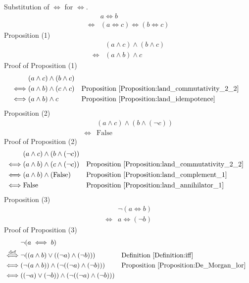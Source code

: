 \begin{prop}
\label{Proposition:iff_substitution_iff}
Substitution of $\iff$ for $\iff$.
\begin{align*}
& a \iff b \\
\iff & (a \iff c) \iff (b \iff c)
\end{align*}
Proposition (1)
\begin{align*}
& (a \land c) \land (b \land c) \\
\iff & (a \land b) \land c
\end{align*}
Proof of Proposition (1)
\begin{align*}
& (a \land c) \land (b \land c) \\
\iff & (a \land b) \land (c \land c)
& & \text{Proposition \ref{Proposition:land_commutativity_2_2}} \\
\iff & (a \land b) \land c
& & \text{Proposition \ref{Proposition:land_idempotence}} \\
\end{align*}
Proposition (2)
\begin{align*}
& (a \land c) \land (b \land (\lnot c)) \\
\iff & \text{False}
\end{align*}
Proof of Proposition (2)
\begin{align*}
& (a \land c) \land (b \land (\lnot c)) \\
\iff & (a \land b) \land (c \land (\lnot c))
& & \text{Proposition \ref{Proposition:land_commutativity_2_2}} \\
\iff & (a \land b) \land (\text{False})
& & \text{Proposition \ref{Proposition:land_complement_1}} \\
\iff & \text{False}
& & \text{Proposition \ref{Proposition:land_annihilator_1}} \\
\end{align*}
Proposition (3)
\begin{align*}
& \lnot (a \iff b) \\
\iff & a \iff (\lnot b)
\end{align*}
Proof of Proposition (3)
\begin{align*}
& \lnot (a \iff b) \\
\overset{\operatorname{def}}{\iff} & \lnot ((a \land b) \lor ((\lnot a) \land (\lnot b)))
& & \text{Definition \ref{Definition:iff}} \\
\iff & (\lnot (a \land b)) \land (\lnot ((\lnot a) \land (\lnot b)))
& & \text{Proposition \ref{Proposition:De_Morgan_lor}} \\
\iff & ((\lnot a) \lor (\lnot b)) \land (\lnot ((\lnot a) \land (\lnot b)))

\end{align*}
\end{prop}
